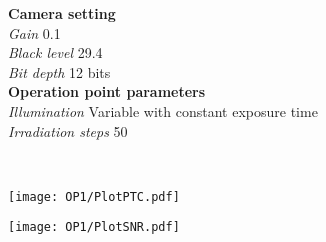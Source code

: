 \documentclass[a4paper,twoside,12pt,american,hidelinks]{article}
\begin{document}
\begin{minipage}[t]{0.975\linewidth}
\begin{multicols}{2}
\textbf{Camera setting} \hfill
\\[1mm]
\textsl{Gain} \hfill 0.1
\\[1mm]
\textsl{Black level} \hfill 29.4
\\[1mm]
\textsl{Bit depth} \hfill 12 bits
\\[1mm]
\textbf{Operation point parameters}
\\[1mm]
\textsl{Illumination} \hfill Variable with constant exposure time
\\[1mm]
\textsl{Irradiation steps} \hfill 50
\\[1mm]
\end{multicols}
\end{minipage}
\\[10mm]
\begin{minipage}[t]{0.690\linewidth}

\texttt{[image: OP1/PlotPTC.pdf]}

\texttt{[image: OP1/PlotSNR.pdf]}
\end{minipage}
\end{document}
